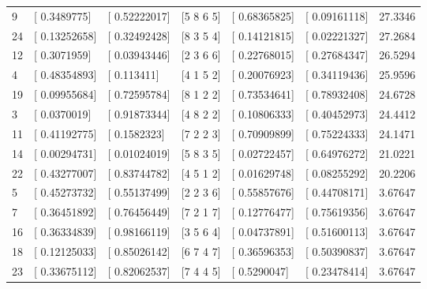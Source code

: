 \begin{table}[h]
\begin{tabular}{@{}lllllll@{}}
    9                & {[} 0.3489775{]}  & {[} 0.52222017{]} & {[}5 8 6 5{]}   & {[} 0.68365825{]}      & {[} 0.09161118{]}    & 27.3346         \\
    24               & {[} 0.13252658{]} & {[} 0.32492428{]} & {[}8 3 5 4{]}   & {[} 0.14121815{]}      & {[} 0.02221327{]}    & 27.2684         \\
    12               & {[} 0.3071959{]}  & {[} 0.03943446{]} & {[}2 3 6 6{]}   & {[} 0.22768015{]}      & {[} 0.27684347{]}    & 26.5294         \\
    4                & {[} 0.48354893{]} & {[} 0.113411{]}   & {[}4 1 5 2{]}   & {[} 0.20076923{]}      & {[} 0.34119436{]}    & 25.9596         \\
    19               & {[} 0.09955684{]} & {[} 0.72595784{]} & {[}8 1 2 2{]}   & {[} 0.73534641{]}      & {[} 0.78932408{]}    & 24.6728         \\
    3                & {[} 0.0370019{]}  & {[} 0.91873344{]} & {[}4 8 2 2{]}   & {[} 0.10806333{]}      & {[} 0.40452973{]}    & 24.4412         \\
    11               & {[} 0.41192775{]} & {[} 0.1582323{]}  & {[}7 2 2 3{]}   & {[} 0.70909899{]}      & {[} 0.75224333{]}    & 24.1471         \\
    14               & {[} 0.00294731{]} & {[} 0.01024019{]} & {[}5 8 3 5{]}   & {[} 0.02722457{]}      & {[} 0.64976272{]}    & 21.0221         \\
    22               & {[} 0.43277007{]} & {[} 0.83744782{]} & {[}4 5 1 2{]}   & {[} 0.01629748{]}      & {[} 0.08255292{]}    & 20.2206         \\
    5                & {[} 0.45273732{]} & {[} 0.55137499{]} & {[}2 2 3 6{]}   & {[} 0.55857676{]}      & {[} 0.44708171{]}    & 3.67647         \\
    7                & {[} 0.36451892{]} & {[} 0.76456449{]} & {[}7 2 1 7{]}   & {[} 0.12776477{]}      & {[} 0.75619356{]}    & 3.67647         \\
    16               & {[} 0.36334839{]} & {[} 0.98166119{]} & {[}3 5 6 4{]}   & {[} 0.04737891{]}      & {[} 0.51600113{]}    & 3.67647         \\
    18               & {[} 0.12125033{]} & {[} 0.85026142{]} & {[}6 7 4 7{]}   & {[} 0.36596353{]}      & {[} 0.50390837{]}    & 3.67647         \\
    23               & {[} 0.33675112{]} & {[} 0.82062537{]} & {[}7 4 4 5{]}   & {[} 0.5290047{]}       & {[} 0.23478414{]}    & 3.67647         \\ \bottomrule
    \end{tabular}
\end{table}

